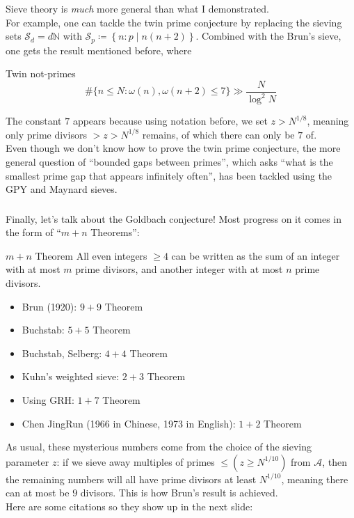 
\begin{frame}\frametitle{\insertsubsection}
Sieve theory is \textit{much} more general than what I demonstrated.
\pause \\[5px]

For example, one can tackle the twin prime conjecture by replacing the sieving sets \(\mathcal{S}_d = d\mathbb{N}\) with \(\mathcal{S}_p \coloneqq \left\{n : p \mid n(n + 2)\right\}\). Combined with the Brun's sieve, one gets the result mentioned before, where
\begin{exampleblock}{Twin not-primes}
\[
  \#\{n \leq N : \omega(n), \omega(n + 2) \leq 7\} \gg \frac{N}{\log^2 N}
\]
\end{exampleblock}

The constant \(7\) appears because using notation before, we set \(z > N^{1 / 8}\), meaning only prime divisors \(> z > N^{1 / 8}\) remains, of which there can only be \(7\) of.
\pause \\[5px]

Even though we don't know how to prove the twin prime conjecture, the more general question of ``bounded gaps between primes'', which asks ``what is the smallest prime gap that appears infinitely often'', has been tackled using the GPY and Maynard sieves.
\end{frame}

\begin{frame}\frametitle{\insertsubsection}
Finally, let's talk about the Goldbach conjecture! Most progress on it comes in the form of ``\(m + n\) Theorems'':
\begin{exampleblock}{\(m + n\) Theorem}
  All even integers \(\geq 4\) can be written as the sum of an integer with at most \(m\) prime divisors, and another integer with at most \(n\) prime divisors.
\end{exampleblock}
\pause

\begin{itemize}
  \item Brun (1920): \(9 + 9\) Theorem
  \item Buchstab: \(5 + 5\) Theorem
  \item Buchstab, Selberg: \(4 + 4\) Theorem
  \item Kuhn's weighted sieve: \(2 + 3\) Theorem
  \item Using GRH: \(1 + 7\) Theorem
  \item Chen JingRun (1966 in Chinese, 1973 in English): \(1 + 2\) Theorem
\end{itemize}

As usual, these mysterious numbers come from the choice of the sieving parameter \(z\): if we sieve away multiples of primes \(\leq (z \geq N^{1 / 10})\) from \(\mathcal{A}\), then the remaining numbers will all have prime divisors at least \(N^{1 / 10}\), meaning there can at most be \(9\) divisors. This is how Brun's result is achieved.
\\

Here are some citations so they show up in the next slide: ~\cite{CojocaruMurty05} ~\cite{Greaves01} ~\cite{Liu22} ~\cite{Maynard19} ~\cite{GPY05}
\end{frame}

